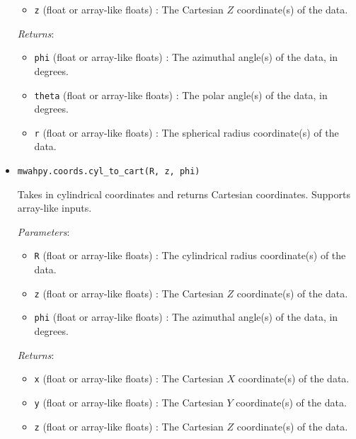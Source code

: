 \documentclass{article}
\begin{document}
\begin{itemize}
\begin{itemize}
\item \verb!z! (float or array-like floats) : The Cartesian $Z$ coordinate(s) of the data.

\end{itemize}

\textit{Returns}: \begin{itemize}

\item \verb!phi! (float or array-like floats) : The azimuthal angle(s) of the data, in degrees.

\item \verb!theta! (float or array-like floats) : The polar angle(s) of the data, in degrees.

\item \verb!r! (float or array-like floats) : The spherical radius coordinate(s) of the data.

\end{itemize}



\item \verb!mwahpy.coords.cyl_to_cart(R, z, phi)!

Takes in cylindrical coordinates and returns Cartesian coordinates. Supports array-like inputs.

\textit{Parameters}: \begin{itemize}

\item \verb!R! (float or array-like floats) : The cylindrical radius coordinate(s) of the data.

\item \verb!z! (float or array-like floats) : The Cartesian $Z$ coordinate(s) of the data.

\item \verb!phi! (float or array-like floats) : The azimuthal angle(s) of the data, in degrees.

\end{itemize}

\textit{Returns}: \begin{itemize}

\item \verb!x! (float or array-like floats) : The Cartesian $X$ coordinate(s) of the data.

\item \verb!y! (float or array-like floats) : The Cartesian $Y$ coordinate(s) of the data.

\item \verb!z! (float or array-like floats) : The Cartesian $Z$ coordinate(s) of the data.


\end{itemize}
\end{itemize}
\end{document}
